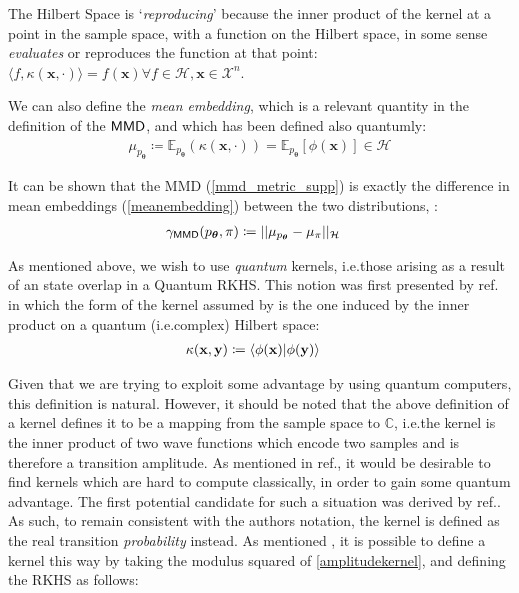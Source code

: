 The Hilbert Space is `\emph{reproducing}' because the inner product of the kernel at a point in the sample space, with a function on the Hilbert space, in some sense \emph{evaluates} or reproduces the function at that point:  $\langle f, \kappa(\mathbf{x}, \cdot)\rangle  = f(\mathbf{x}) \forall f \in \mathcal{H}, \mathbf{x} \in \mathcal{X}^n$. 

We can also define the \emph{mean embedding}, which is a relevant quantity in the definition of the $\operatorname{\textsf{MMD}}$, and which has been defined also quantumly:
\begin{align}
    \mu_{p_{\boldsymbol\theta}}  \coloneqq \mathbb{E}_{p_{\boldsymbol\theta}}(\kappa(\mathbf{x}, \cdot)) =\mathbb{E}_{p_{\boldsymbol\theta}}[\phi(\mathbf{x})] \in \mathcal{H} \label{meanembedding}
\end{align}

It can be shown that the \textsf{MMD} (\eqref{mmd_metric_supp}) is exactly the difference in mean embeddings (\eqref{meanembedding}) between the two distributions, :
\begin{align}
    \gamma_{\operatorname{\textsf{MMD}}}(p_{\boldsymbol\theta}, \pi) &  \coloneqq ||\mu_{p_{\boldsymbol\theta}} - \mu_{\pi}||_{\mathcal{H}}\label{mmd_mean_embedding}
\end{align}

As mentioned above, we wish to use \emph{quantum} kernels, i.e.\@ those arising as a result of an state overlap in a Quantum RKHS. This notion was first presented by ref.  in which the form of the kernel assumed by is the one induced by the inner product on a quantum (i.e.\@ complex) Hilbert space:
\begin{align}
\kappa(\mathbf{x}, \mathbf{y}) & \coloneqq \braket{\phi(\mathbf{x})|\phi(\mathbf{y})} \label{amplitudekernel}
\end{align}

Given that we are trying to exploit some advantage by using quantum computers, this definition is natural. However, it should be noted that the above definition of a kernel defines it to be a mapping from the sample space to $\mathbb{C}$, i.e.\@ the kernel is the inner product of two wave functions which encode two samples and is therefore a transition amplitude. As mentioned in ref., it would be desirable to find kernels which are hard to compute classically, in order to gain some quantum advantage. The first potential candidate for such a situation was derived by ref.. As such, to remain consistent with the authors notation, the kernel is defined as the real transition \emph{probability} instead. As mentioned , it is possible to define a kernel this way by taking the modulus squared of \eqref{amplitudekernel}, and defining the RKHS as follows:

